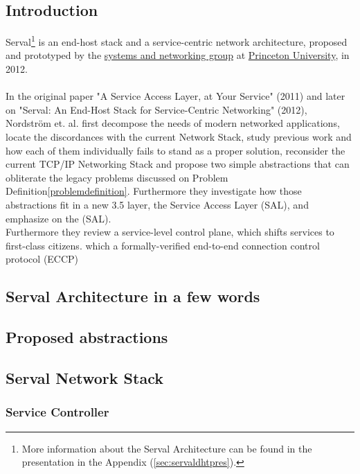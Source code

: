 \subsection{Introduction}
Serval\footnote{More information about the Serval Architecture can be found in the presentation in the Appendix (\ref{sec:servaldhtpres}).} is an end-host stack and a service-centric network architecture, proposed and prototyped by the \href{https://sns.cs.princeton.edu/}{systems and networking group} at \href{https://www.princeton.edu}{Princeton University}, in 2012.

\paragraph{} In the original paper "A Service Access Layer, at Your Service" (2011)\cite{Freedman2011} and later on "Serval: An End-Host Stack for Service-Centric Networking" (2012)\cite{Nordstrom2012}, Nordstr{\"o}m et. al. first decompose the needs of modern networked applications, locate the discordances with the current Network Stack, study previous work and how each of them individually fails to stand as a proper solution, reconsider the current TCP/IP Networking Stack and propose two simple abstractions that can obliterate the legacy problems discussed on Problem Definition\ref{problemdefinition}.
\indent Furthermore they investigate how those abstractions fit in a new 3.5 layer, the Service Access Layer (SAL), and emphasize on the (SAL).\\
\indent Furthermore they review a service-level control plane, which shifts services to first-class citizens. which a formally-verified end-to-end connection control protocol (ECCP)

\subsection{Serval Architecture in a few words}


\subsection{Proposed abstractions}



\subsection{Serval Network Stack}
\subsubsection{Service Controller}
